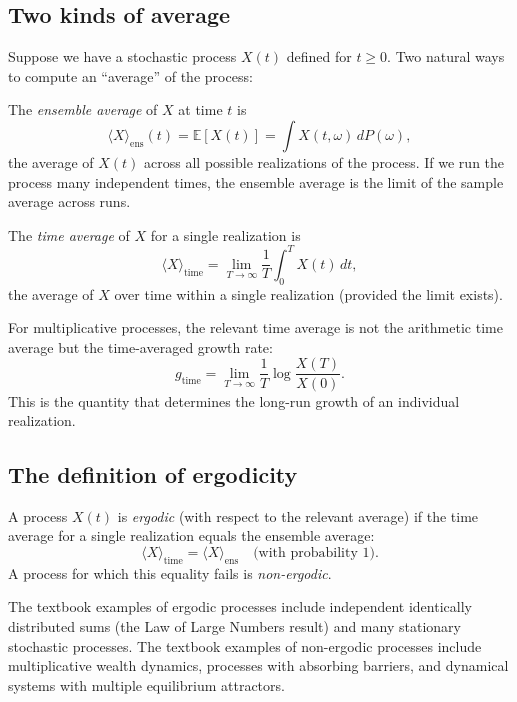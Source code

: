 \subsection{Two kinds of average}

Suppose we have a stochastic process $X(t)$ defined for $t \geq 0$.
Two natural ways to compute an ``average'' of the process:

\begin{definition}
\label{def:ensemble-avg}
The \emph{ensemble average} of $X$ at time $t$ is
\[
    \langle X \rangle_{\text{ens}}(t) = \mathbb{E}[X(t)] =
    \int X(t, \omega)\, dP(\omega),
\]
the average of $X(t)$ across all possible realizations of the
process. If we run the process many independent times, the
ensemble average is the limit of the sample average across runs.
\end{definition}

\begin{definition}
\label{def:time-avg}
The \emph{time average} of $X$ for a single realization is
\[
    \langle X \rangle_{\text{time}} = \lim_{T \to \infty}
    \frac{1}{T} \int_0^T X(t)\, dt,
\]
the average of $X$ over time within a single realization (provided
the limit exists).
\end{definition}

For multiplicative processes, the relevant time average is not the
arithmetic time average but the time-averaged growth rate:
\[
    g_{\text{time}} = \lim_{T \to \infty} \frac{1}{T} \log\frac{X(T)}{X(0)}.
\]
This is the quantity that determines the long-run growth of an
individual realization.

\subsection{The definition of ergodicity}

\begin{definition}[Ergodicity]
\label{def:ergodicity}
A process $X(t)$ is \emph{ergodic} (with respect to the relevant
average) if the time average for a single realization equals the
ensemble average:
\[
    \langle X \rangle_{\text{time}} = \langle X \rangle_{\text{ens}}
    \quad \text{(with probability 1).}
\]
A process for which this equality fails is \emph{non-ergodic}.
\end{definition}

The textbook examples of ergodic processes include independent
identically distributed sums (the Law of Large Numbers result) and
many stationary stochastic processes. The textbook examples of
non-ergodic processes include multiplicative wealth dynamics,
processes with absorbing barriers, and dynamical systems with
multiple equilibrium attractors.


